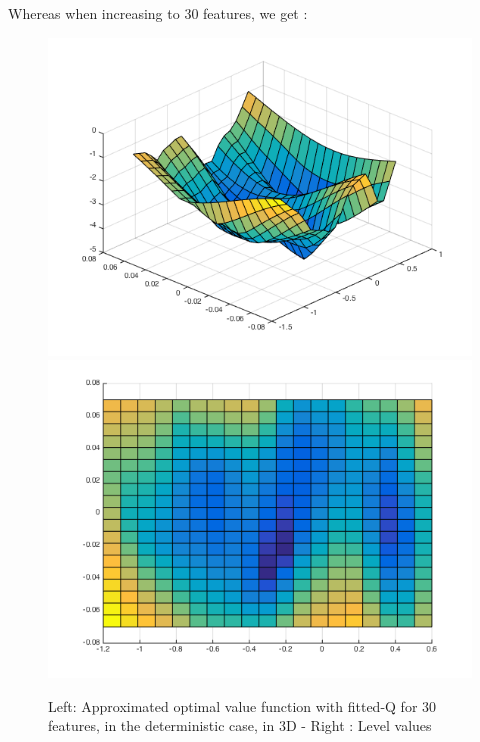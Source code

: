 \documentclass[a4paper, 12pt]{article}
\begin{document}
Whereas when increasing to 30 features, we get :
\begin{figure}[H]
	\centering
	\noindent\includegraphics[scale=0.3]{fittedQ-30feat-determ.png}
	\noindent\includegraphics[scale=0.3]{fittedQ-30feat-determ-flat.png}
	\caption{Left: Approximated optimal value function with fitted-Q for 30 features, in the deterministic case, in 3D - Right : Level values}
\end{figure}
\end{document}

